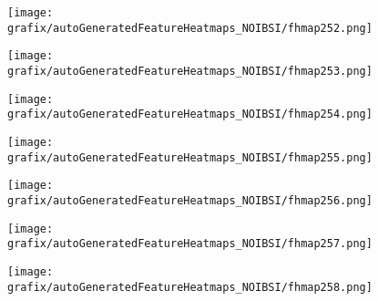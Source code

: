 \begin{subfigure}{\wid\textwidth} 
    \centering 
    \caption{\tiny \sffamily {}} 
    \vspace{\vsp} 
    \texttt{[image: grafix/autoGeneratedFeatureHeatmaps\_NOIBSI/fhmap252.png]} 
\end{subfigure} 
\hspace{\hsp} 
\begin{subfigure}{\wid\textwidth} 
    \centering 
    \caption{\tiny \sffamily {}} 
    \vspace{\vsp} 
    \texttt{[image: grafix/autoGeneratedFeatureHeatmaps\_NOIBSI/fhmap253.png]} 
\end{subfigure} 
\hspace{\hsp} 
\begin{subfigure}{\wid\textwidth} 
    \centering 
    \caption{\tiny \sffamily {}} 
    \vspace{\vsp} 
    \texttt{[image: grafix/autoGeneratedFeatureHeatmaps\_NOIBSI/fhmap254.png]} 
\end{subfigure} 
\hspace{\hsp} 
\begin{subfigure}{\wid\textwidth} 
    \centering 
    \caption{\tiny \sffamily {}} 
    \vspace{\vsp} 
    \texttt{[image: grafix/autoGeneratedFeatureHeatmaps\_NOIBSI/fhmap255.png]} 
\end{subfigure} 
\hspace{\hsp} 
\begin{subfigure}{\wid\textwidth} 
    \centering 
    \caption{\tiny \sffamily {}} 
    \vspace{\vsp} 
    \texttt{[image: grafix/autoGeneratedFeatureHeatmaps\_NOIBSI/fhmap256.png]} 
\end{subfigure} 
\hspace{\hsp} 
\begin{subfigure}{\wid\textwidth} 
    \centering 
    \caption{\tiny \sffamily {}} 
    \vspace{\vsp} 
    \texttt{[image: grafix/autoGeneratedFeatureHeatmaps\_NOIBSI/fhmap257.png]} 
\end{subfigure} 
\hspace{\hsp} 
\begin{subfigure}{\wid\textwidth} 
    \centering 
    \caption{\tiny \sffamily {}} 
    \vspace{\vsp} 
    \texttt{[image: grafix/autoGeneratedFeatureHeatmaps\_NOIBSI/fhmap258.png]} 
\end{subfigure} 
